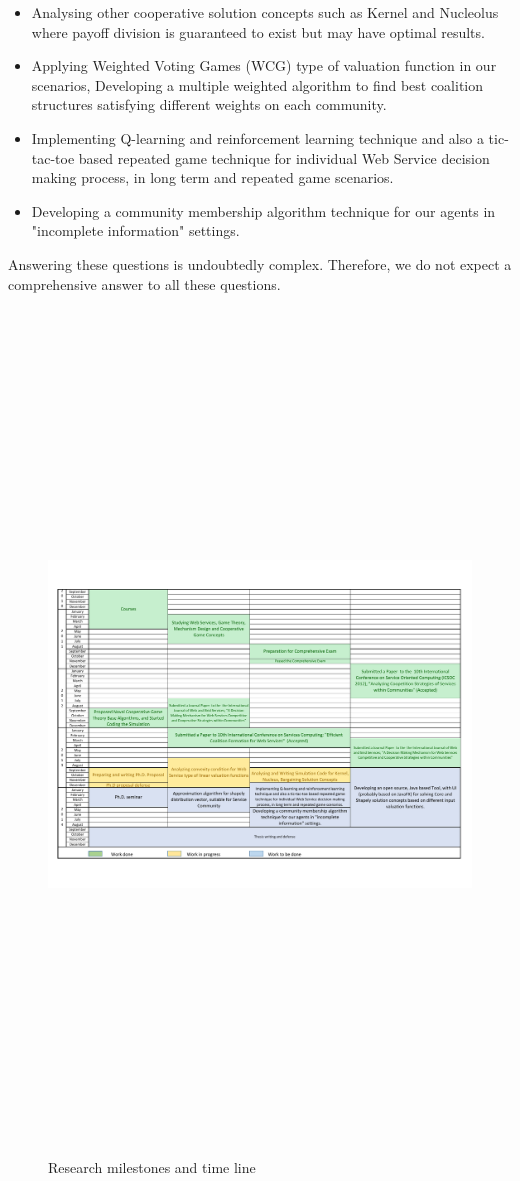\begin{itemize}
\item Analysing other cooperative solution concepts such as Kernel and Nucleolus where payoff division is guaranteed to exist but may have optimal results.
\item Applying Weighted Voting Games (WCG) type of valuation function in our scenarios, Developing a multiple weighted algorithm to find best coalition structures satisfying different weights on each community.
\item Implementing Q-learning and reinforcement learning technique and also a tic-tac-toe based repeated game technique for individual Web Service decision making process, in long term and repeated game scenarios.
\item Developing a community membership algorithm technique for our agents in "incomplete information" settings.
\end{itemize}
Answering these questions is undoubtedly complex. Therefore, we do not expect a comprehensive answer to all these questions.

    \begin{figure}
                \begin{center}
                \includegraphics[width=16cm, height=22cm]{timeline/timetable.pdf}\label{Timetable}
                \caption{Research milestones and time line}
                \end{center}
    \end{figure}   
